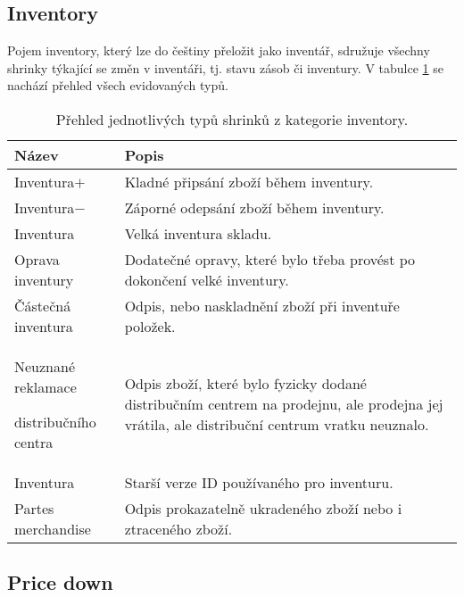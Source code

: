 \subsection*{Inventory}

Pojem inventory, který lze do češtiny přeložit jako inventář, sdružuje všechny shrinky týkající se změn v inventáři, tj. stavu zásob či inventury. V tabulce \ref*{tab:sh:inv} se nachází přehled všech evidovaných typů.

\begin{table}[hbtp!]
    \caption{Přehled jednotlivých typů shrinků z kategorie inventory.}
    \label{tab:sh:inv}
    \begin{tabular}{ p{4cm} p{10.5cm}}
     Název             & Popis \\
    \hline
              Inventura$+$             & Kladné připsání zboží během inventury.      \\
              Inventura$-$             & Záporné odepsání zboží během inventury.      \\
              Inventura              & Velká inventura skladu.     \\
              Oprava inventury       & Dodatečné opravy, které bylo třeba provést po dokončení velké inventury.      \\
              Částečná inventura     & Odpis, nebo naskladnění zboží při inventuře položek.      \\
              Neuznané reklamace \par distribučního centra  \strut &  Odpis zboží, které bylo fyzicky dodané distribučním centrem na prodejnu, ale prodejna jej vrátila, ale distribuční centrum vratku neuznalo.     \\
              Inventura              & Starší verze ID používaného pro inventuru.\\
              Partes merchandise     & Odpis prokazatelně ukradeného zboží nebo i ztraceného zboží.      \\
    \end{tabular}
\end{table}


\subsection*{Price down}

